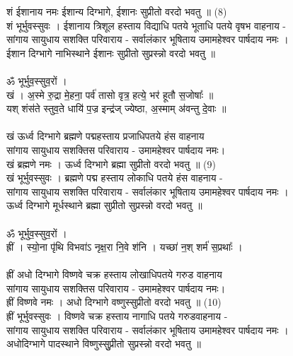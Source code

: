 शं ईशानाय नमः  ईशान्य दिग्भागे, ईशानः सुप्रीतो  वरदो भवतु ॥ (8)\\
{\small शं भूर्भुवस्सुवः । ईशानाय त्रिशूल हस्ताय विद्याधि पतये भूताधि पतये वृषभ वाहनाय -\\
सांगाय सायुधाय सशक्ति परिवाराय - सर्वालंकार भूषिताय उमामहेश्वर पार्षदाय नमः ।\\
ईशान दिग्भागे नाभिस्थाने ईशानः सुप्रीतो सुप्रस्न्नो वरदो भवतु ॥}\\
\\
ॐ भूर्भुव॒स्सुव॒रों ।\\
खं । अ॒स्मे रु॒द्रा मे॒हना॒ पर्व॑ तासो वृत्र॒ हत्ये॒ भर॑ हूतौ स॒जोषाः᳚ ॥\\
यश् शंस॑ते स्तुव॒ते धायि॑ प॒ज्र इन्द्र॑ज् ज्येष्ठा, अ॒स्माम् अ॑वन्तु दे॒वाः ॥\\
\\
खं ऊर्ध्व दिग्भागे ब्रह्मणे पद्महस्ताय प्रजाधिपतये हंस वाहनाय\\
सांगाय सायुधाय सशक्तिस परिवाराय -  उमामहेश्वर पार्षदाय नमः।\\
खं ब्रह्मणे नमः । ऊर्ध्व दिग्भागे ब्रह्मा सुप्रीतो  वरदो भवतु ॥  (9)\\
{\small खं भूर्भुवस्सुवः । ब्रह्मणे पद्म हस्ताय लोकाधि पतये हंस वाहनाय -\\
सांगाय सायुधाय सशक्ति परिवाराय - सर्वालंकार भूषिताय उमामहेश्वर पार्षदाय नमः ।\\
ऊर्ध्व दिग्भागे मूर्धस्थाने ब्रह्मा सुप्रीतो सुप्रस्न्नो वरदो भवतु ॥}\\
\\
ॐ भूर्भुव॒स्सुव॒रों ।\\
ह्रीं । स्यो॒ना पृ॑थि विभवा॑ऽ नृक्ष॒रा नि॒वे श॑नि । यच्छा॑ न॒श् शर्म॑ स॒प्रथाः᳚ ।\\
\\
ह्रीं अधो दिग्भागे विष्णवे चक्र हस्ताय लोखाधिपतये गरुड वाहनाय\\
सांगाय सायुधाय सशक्तिस परिवाराय -  उमामहेश्वर पार्षदाय नमः।\\
ह्रीं विष्णवे नमः । अधो दिग्भागे वष्णुस्सुप्रीतो वरदो भवतु ॥  (10)\\
{\small ह्रीं भूर्भुवस्सुवः । विष्णवे चक्र हस्ताय नागाधि पतये गरुडवाहनाय -\\
सांगाय सायुधाय सशक्ति परिवाराय - सर्वालंकार भूषिताय उमामहेश्वर पार्षदाय नमः ।\\
अधोदिग्भागे पादस्थाने विष्णुस्सुुप्रीतो सुप्रस्न्नो वरदो भवतु ॥}\\
